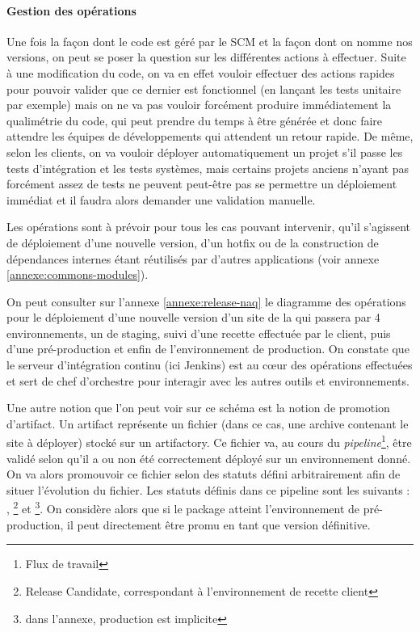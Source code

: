 \paragraph{Gestion des opérations}

Une fois la façon dont le code est géré par le \gls{SCM} et la façon dont on nomme nos versions, on peut se poser la question sur les différentes actions à effectuer. Suite à une modification du code, on va en effet vouloir effectuer des actions rapides pour pouvoir valider que ce dernier est fonctionnel (en lançant les tests unitaire par exemple) mais on ne va pas vouloir forcément produire immédiatement la qualimétrie du code, qui peut prendre du temps à être générée et donc faire attendre les équipes de développements qui attendent un retour rapide. De même, selon les clients, on va vouloir déployer automatiquement un projet s'il passe les tests d'intégration et les tests systèmes, mais certains projets anciens n'ayant pas forcément assez de tests ne peuvent peut-être pas se permettre un déploiement immédiat et il faudra alors demander une validation manuelle.

Les opérations sont à prévoir pour tous les cas pouvant intervenir, qu'il s'agissent de déploiement d'une nouvelle version, d'un \gls{hotfix} ou de la construction de dépendances internes étant réutilisés par d'autres applications (voir annexe \ref{annexe:commons-modules}).

On peut consulter sur l'annexe \ref{annexe:release-naq} le diagramme des opérations pour le déploiement d'une nouvelle version d'un site de la \naq{} qui passera par 4 environnements, un de staging, suivi d'une recette effectuée par le client, puis d'une pré-production et enfin de l'environnement de production. On constate que le serveur d'intégration continu (ici Jenkins) est au cœur des opérations effectuées et sert de chef d'orchestre pour interagir avec les autres outils et environnements. 

Une autre notion que l'on peut voir sur ce schéma est la notion de promotion d'artifact. Un artifact représente un fichier (dans ce cas, une archive contenant le site à déployer) stocké sur un \gls{artifactory}. Ce fichier va, au cours du \emph{pipeline}\footnote{Flux de travail}, être validé selon qu'il a ou non été correctement déployé sur un environnement donné. On va alors promouvoir ce fichier selon des statuts défini arbitrairement afin de situer l'évolution du fichier. Les statuts définis dans ce pipeline sont les suivants : , \footnote{Release Candidate, correspondant à l'environnement de recette client} et \footnote{dans l'annexe, production est implicite}. On considère alors que si le package atteint l'environnement de pré-production, il peut directement être promu en tant que version définitive.

